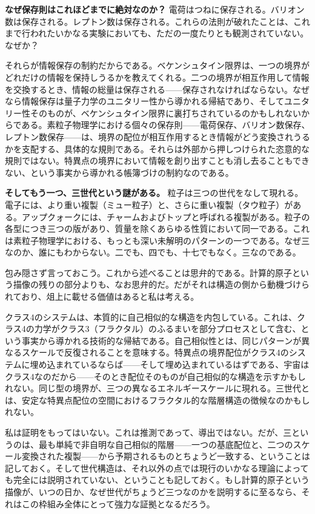 \documentclass[11pt, twoside, openright]{book}
\begin{document}
\textbf{なぜ保存則はこれほどまでに絶対なのか？} 電荷はつねに保存される。バリオン数は保存される。レプトン数は保存される。これらの法則が破れたことは、これまで行われたいかなる実験においても、ただの一度たりとも観測されていない。なぜか？

それらが情報保存の制約だからである。ベケンシュタイン限界は、一つの境界がどれだけの情報を保持しうるかを教えてくれる。二つの境界が相互作用して情報を交換するとき、情報の総量は保存される------保存されなければならない。なぜなら情報保存は量子力学のユニタリー性から導かれる帰結であり、そしてユニタリー性そのものが、ベケンシュタイン限界に裏打ちされているのかもしれないからである。素粒子物理学における個々の保存則------電荷保存、バリオン数保存、レプトン数保存------は、境界の配位が相互作用するとき情報がどう変換されうるかを支配する、具体的な規則である。それらは外部から押しつけられた恣意的な規則ではない。特異点の境界において情報を創り出すことも消し去ることもできない、という事実から導かれる帳簿づけの制約なのである。

\textbf{そしてもう一つ、三世代という謎がある。} 粒子は三つの世代をなして現れる。電子には、より重い複製（ミュー粒子）と、さらに重い複製（タウ粒子）がある。アップクォークには、チャームおよびトップと呼ばれる複製がある。粒子の各型につき三つの版があり、質量を除くあらゆる性質において同一である。これは素粒子物理学における、もっとも深い未解明のパターンの一つである。なぜ三なのか、誰にもわからない。二でも、四でも、十七でもなく。三なのである。

包み隠さず言っておこう。これから述べることは思弁的である。計算的原子という描像の残りの部分よりも、なお思弁的だ。だがそれは構造の側から動機づけられており、俎上に載せる価値はあると私は考える。

クラス4のシステムは、本質的に自己相似的な構造を内包している。これは、クラス4の力学がクラス3（フラクタル）のふるまいを部分プロセスとして含む、という事実から導かれる技術的な帰結である。自己相似性とは、同じパターンが異なるスケールで反復されることを意味する。特異点の境界配位がクラス4のシステムに埋め込まれているならば------そして埋め込まれているはずである、宇宙はクラス4なのだから------そのとき配位そのものが自己相似的な構造を示すかもしれない。同じ型の境界が、三つの異なるエネルギースケールに現れる。三世代とは、安定な特異点配位の空間におけるフラクタル的な階層構造の徴候なのかもしれない。

私は証明をもってはいない。これは推測であって、導出ではない。だが、三というのは、最も単純で非自明な自己相似的階層------一つの基底配位と、二つのスケール変換された複製------から予期されるものとちょうど一致する、ということは記しておく。そして世代構造は、それ以外の点では現行のいかなる理論によっても完全には説明されていない、ということも記しておく。もし計算的原子という描像が、いつの日か、なぜ世代がちょうど三つなのかを説明するに至るなら、それはこの枠組み全体にとって強力な証拠となるだろう。
\end{document}
